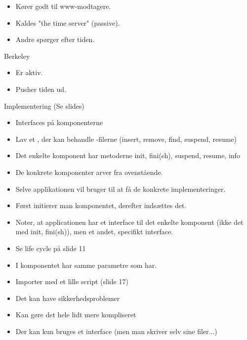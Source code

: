 \documentclass[oneside, 10pt]{memoir}
\begin{document}
\begin{itemize}
	\item Kører godt til www-modtagere.
	\item Kaldes "the time server" (passive).
	\item Andre spørger efter tiden.
\end{itemize}
Berkeley

\begin{itemize}
	\item Er aktiv.
	\item Pusher tiden ud.
\end{itemize}
Implementering (Se slides)

\begin{itemize}
	\item Interfaces på komponenterne
	\item Lav et , der kan behandle -filerne (insert, remove, find, suspend, resume)
	\item Det enkelte komponent har metoderne init, fini(sh), suspend, resume, info
	\item De konkrete komponenter arver fra ovenstående.
	\item Selve applikationen vil bruger  til at få de konkrete implementeringer.

	\item Først initierer man komponentet, derefter indsættes det.
	\item Noter, at applicationen har et interface til det enkelte komponent (ikke det med init, fini(sh)), men et andet, specifikt interface.
	\item Se life cycle på slide 11

	\item I komponentet har  samme parametre som  har.

	\item Importer med et lille script (slide 17)
	\item Det kan have sikkerhedsproblemer
	\item Kan gøre det hele lidt mere kompliseret
	\item Der kan kun bruges et interface (men man skriver selv sine filer...)
\end{itemize}
\end{document}
